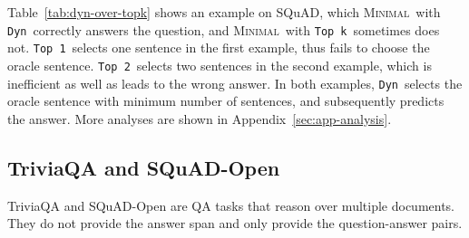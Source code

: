 \documentclass[11pt,a4paper]{article}
\newcommand{\topk}{{\tt Top k}}
\newcommand{\dyn}{{\tt Dyn}}
\newcommand{\topone}{{\tt Top 1}}
\newcommand{\toptwo}{{\tt Top 2}}
\newcommand{\ours}{\textsc{Minimal}}
\begin{document}
Table~\ref{tab:dyn-over-topk} shows an example on SQuAD, which \ours~with \dyn~correctly answers the question, and \ours~with \topk~sometimes does not. \topone~selects one sentence in the first example, thus fails to choose the oracle sentence. \toptwo~selects two sentences in the second example, which is inefficient as well as leads to the wrong answer. In both examples, \dyn~selects the oracle sentence with minimum number of sentences, and subsequently predicts the answer. More analyses are shown in Appendix~\ref{sec:app-analysis}.

\subsection{TriviaQA and SQuAD-Open}\label{sec:triviaqa-and-squad-open}
TriviaQA and SQuAD-Open are QA tasks that reason over multiple documents.
They do not provide the answer span and only provide the question-answer pairs.
\end{document}
